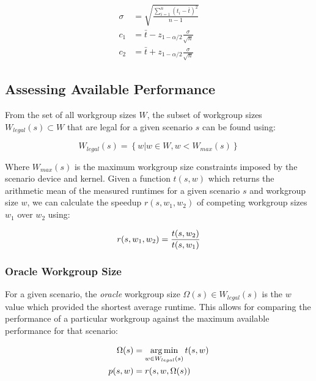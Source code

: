 \begin{align}
\sigma &= \sqrt{\frac{\sum_{i=1}^{n}(t_i - \bar{t})^2}{n - 1}}\\
c_1 &= \bar{t} - z_{1-\alpha/2}\frac{\sigma}{\sqrt{n}}\\
c_2 &= \bar{t} + z_{1-\alpha/2}\frac{\sigma}{\sqrt{n}}
\end{align}



\subsection{Assessing Available Performance}

From the set of all workgroup sizes $W$, the subset of workgroup sizes
$W_{legal}(s) \subset W$ that are legal for a given scenario $s$ can
be found using:

\begin{equation}
W_{legal}(s) = \left\{w | w \in W, w < W_{max}(s) \right\}
\end{equation}

Where $W_{max}(s)$ is the maximum workgroup size constraints imposed
by the scenario device and kernel. Given a function $t(s,w)$ which
returns the arithmetic mean of the measured runtimes for a given
scenario $s$ and workgroup size $w$, we can calculate the speedup
$r(s, w_1, w_2)$ of competing workgroup sizes $w_1$ over $w_2$ using:

\begin{equation}
  r(s, w_1, w_2) = \frac{t(s,w_2)}{t(s,w_1)}\\
\end{equation}


\subsubsection{Oracle Workgroup Size}

For a given scenario, the \emph{oracle} workgroup size
$\Omega(s) \in W_{legal}(s)$ is the $w$ value which provided the
shortest average runtime. This allows for comparing the performance of
a particular workgroup against the maximum available performance for
that scenario:

\begin{align}
  \Omega(s) &= \operatorname*{arg\,min}_{w \in W_{legal}(s)} t(s,w)\\
  p(s,w) &= r(s, w, \Omega(s))
\end{align}

